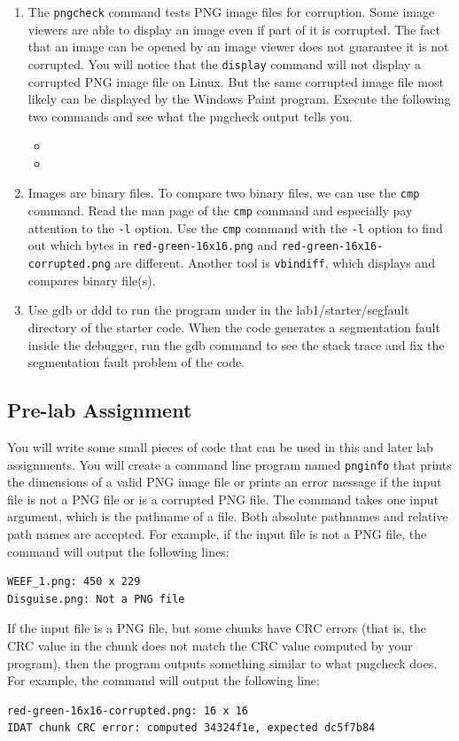 \begin{enumerate}
    \item The \verb+pngcheck+ command tests PNG image files for corruption. Some image viewers are able to display an image even if part of it is corrupted. The fact that an image can be opened by an image viewer does not guarantee it is not corrupted. You will notice that the \verb+display+ command will not display a corrupted PNG image file on Linux. But the same corrupted image file most likely can be displayed by the Windows Paint program. Execute the following two commands and see what the pngcheck output tells you.
      \begin{itemize}
      \item {}
      \item {}
      \end{itemize}
    \item Images are binary files. To compare two binary files, we can use the \verb+cmp+ command. Read the man page of the \verb+cmp+ command and especially pay attention to the \verb+-l+ option. Use the \verb+cmp+ command with the \verb+-l+ option to find out which bytes in \verb+red-green-16x16.png+ and \verb+red-green-16x16-corrupted.png+ are different. Another tool is \verb+vbindiff+, which displays and compares binary file(s).  
     \item Use gdb or ddd to run the program under in the lab1/starter/segfault directory of the starter code. When the code generates a segmentation fault inside the debugger, run the gdb command  to see the stack trace and fix the segmentation fault problem of the code. 
\end{enumerate}

\subsection{Pre-lab Assignment}
\label{sec:lab1_prelab_assignment}
You will write some small pieces of code that can be used in this and later lab assignments. You will create a command line program named \verb+pnginfo+ that prints the dimensions of a valid PNG image file or prints an error message if the input file is not a PNG file or is a corrupted PNG file. The command takes one input argument, which is the pathname of a file. Both absolute pathnames and relative path names are accepted. For example, if the input file is not a PNG file, the command  will output the following lines: 
\begin{verbatim}
WEEF_1.png: 450 x 229 
Disguise.png: Not a PNG file 
\end{verbatim}
If the input file is a PNG file, but some chunks have CRC errors (that is, the CRC value in the chunk does not match the CRC value computed by your program), then the program outputs something similar to what pngcheck does. For example, the command  will output the following line:
\begin{verbatim}
red-green-16x16-corrupted.png: 16 x 16 
IDAT chunk CRC error: computed 34324f1e, expected dc5f7b84
\end{verbatim}


